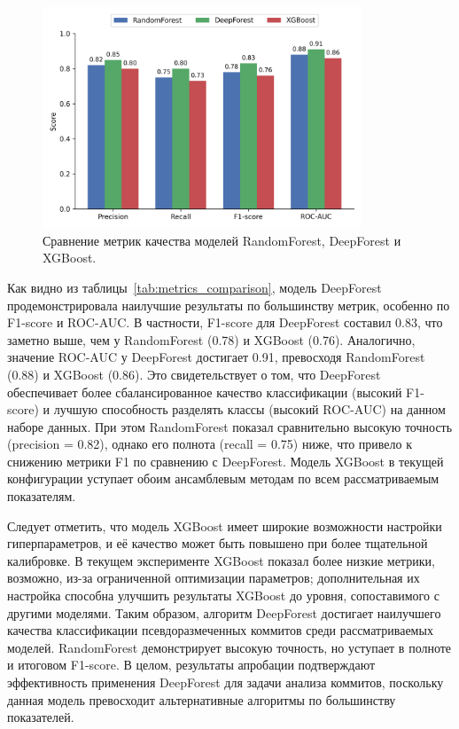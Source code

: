 \begin{figure}[ht]
	\centering
	\includegraphics[width=0.85\textwidth]{my_folder/images/model_comparison.png}
	\caption{Сравнение метрик качества моделей RandomForest, DeepForest и XGBoost.}
	\label{fig:metrics_comparison}
\end{figure}

Как видно из таблицы~\ref{tab:metrics_comparison}, модель DeepForest продемонстрировала наилучшие результаты по большинству метрик, особенно по F1-score и ROC-AUC. В частности, F1-score для DeepForest составил 0.83, что заметно выше, чем у RandomForest (0.78) и XGBoost (0.76). Аналогично, значение ROC-AUC у DeepForest достигает 0.91, превосходя RandomForest (0.88) и XGBoost (0.86). Это свидетельствует о том, что DeepForest обеспечивает более сбалансированное качество классификации (высокий F1-score) и лучшую способность разделять классы (высокий ROC-AUC) на данном наборе данных. При этом RandomForest показал сравнительно высокую точность (precision = 0.82), однако его полнота (recall = 0.75) ниже, что привело к снижению метрики F1 по сравнению с DeepForest. Модель XGBoost в текущей конфигурации уступает обоим ансамблевым методам по всем рассматриваемым показателям.

Следует отметить, что модель XGBoost имеет широкие возможности настройки гиперпараметров, и её качество может быть повышено при более тщательной калибровке. В текущем эксперименте XGBoost показал более низкие метрики, возможно, из-за ограниченной оптимизации параметров; дополнительная их настройка способна улучшить результаты XGBoost до уровня, сопоставимого с другими моделями. Таким образом, алгоритм DeepForest достигает наилучшего качества классификации псевдоразмеченных коммитов среди рассматриваемых моделей. RandomForest демонстрирует высокую точность, но уступает в полноте и итоговом F1-score. В целом, результаты апробации подтверждают эффективность применения DeepForest для задачи анализа коммитов, поскольку данная модель превосходит альтернативные алгоритмы по большинству показателей.


